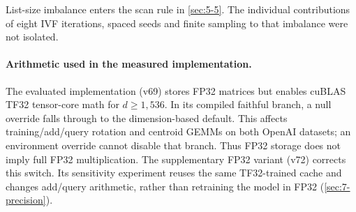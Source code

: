 List-size imbalance enters the scan rule in \cref{sec:5-5}. The
individual contributions of eight IVF iterations, spaced seeds and
finite sampling to that imbalance were not isolated.


\paragraph{Arithmetic used in the measured implementation.}
The evaluated implementation (v69) stores FP32 matrices but enables cuBLAS
TF32 tensor-core math for $d\geq1{,}536$. In its compiled faithful branch,
a null override falls through to the dimension-based default. This affects
training/add/query rotation and centroid GEMMs on both OpenAI datasets;
an environment override cannot disable that branch. Thus FP32 storage does
not imply full FP32 multiplication. The supplementary FP32 variant (v72)
corrects this switch. Its sensitivity experiment reuses the same
TF32-trained cache and changes add/query arithmetic, rather than retraining
the model in FP32 (\cref{sec:7-precision}).
